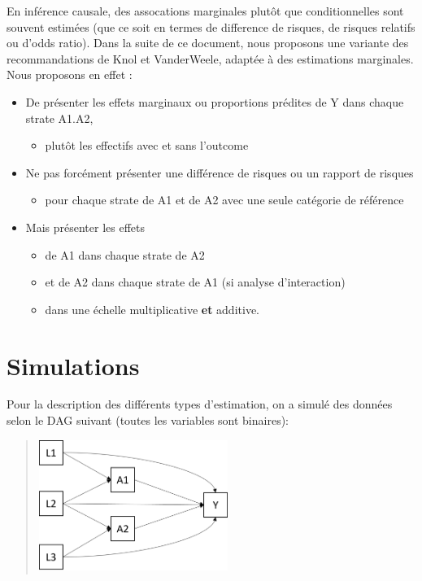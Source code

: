 \documentclass[
]{book}
\providecommand{\tightlist}{%
  \setlength{\itemsep}{0pt}\setlength{\parskip}{0pt}}
\begin{document}
En inférence causale, des assocations marginales plutôt que conditionnelles sont souvent estimées (que ce soit en termes de difference de risques, de risques relatifs ou d'odds ratio). Dans la suite de ce document, nous proposons une variante des recommandations de Knol et VanderWeele, adaptée à des estimations marginales. Nous proposons en effet :

\begin{itemize}
\tightlist
\item
  De présenter les effets marginaux ou proportions prédites de Y dans chaque strate A1.A2,

  \begin{itemize}
  \tightlist
  \item
    plutôt les effectifs avec et sans l'outcome
  \end{itemize}
\item
  Ne pas forcément présenter une différence de risques ou un rapport de risques

  \begin{itemize}
  \tightlist
  \item
    pour chaque strate de A1 et de A2 avec une seule catégorie de référence
  \end{itemize}
\item
  Mais présenter les effets

  \begin{itemize}
  \tightlist
  \item
    de A1 dans chaque strate de A2
  \item
    et de A2 dans chaque strate de A1 (si analyse d'interaction)
  \item
    dans une échelle multiplicative \textbf{et} additive.
  \end{itemize}
\end{itemize}

\hypertarget{simulations}{%
\chapter{Simulations}\label{simulations}}

Pour la description des différents types d'estimation, on a simulé des données selon le DAG suivant (toutes les variables sont binaires):

\begin{quote}
\includegraphics[width=0.5\textwidth,height=\textheight]{img/Image10.png}
\end{quote}
\end{document}
